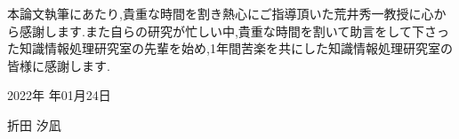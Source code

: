 
本論文執筆にあたり,貴重な時間を割き熱心にご指導頂いた荒井秀一教授に心から感謝します.また自らの研究が忙しい中,貴重な時間を割いて助言をして下さった知識情報処理研究室の先輩を始め,1年間苦楽を共にした知識情報処理研究室の皆様に感謝します.

\begin{flushright}

	\large

	2022年 年01月24日

	\Large

	折田 汐凪

\end{flushright}
